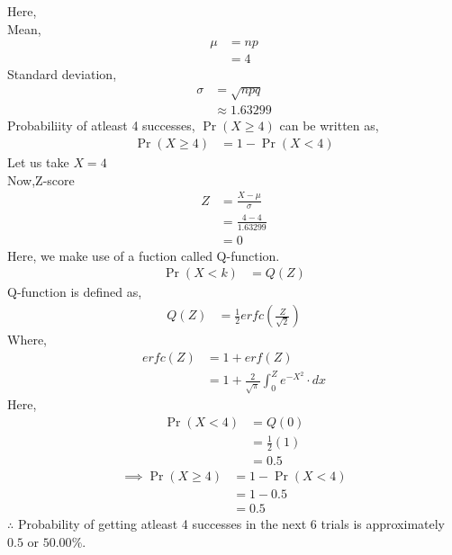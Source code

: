 \documentclass[journal,12pt,onecolumn]{article}
\providecommand{\pr}[1]{\ensuremath{\Pr\left(#1\right)}}
\theoremstyle{remark}
\begin{document}
\begin{enumerate}
		Here, \\ Mean, 
\begin{align}
\mu &= np\\
 &= 4
\end{align}
Standard deviation, 
\begin{align}
\sigma &= \sqrt{npq}\\
&\approx 1.63299
\end{align}
Probabiliity of atleast 4 successes, $\pr{X\geq4}$ can be written as,
\begin{align}
\pr{X\geq4} &= 1-\pr{X<4}
\end{align} 
Let us take $X = 4$\\
Now,Z-score
\begin{align}
Z &= \frac{X - \mu}{\sigma} \\
 &= \frac{4-4}{1.63299} \\
 &= 0
\end{align}
Here, we make use of a fuction called Q-function.
		\begin{align}
			\pr{X<k} &= Q(Z)
		\end{align}
		Q-function is defined as, 
		\begin{align}
			Q(Z) &= \frac{1}{2} erfc \left(\frac{Z}{\sqrt 2}\right)
		\end{align}
		Where,
		\begin{align}
			erfc(Z) &= 1 + erf(Z)\\
			&= 1 + \frac{2}{\sqrt \pi}\int_{0}^{Z}e^{-X^2}\cdot dx
		\end{align}
Here,			
\begin{align}
	\pr{X<4} &= Q(0)\\
	&= \frac{1}{2} (1)\\
	&= 0.5
\end{align}
\begin{align}
\implies \pr{X\geq4} &= 1-\pr{X<4}\\
	&= 1- 0.5\\
	&= 0.5
\end{align}
$\therefore$ Probability of getting atleast 4 successes in the next 6 trials is approximately $0.5$ or $50.00\%$. 
\end{enumerate}
\end{document}
